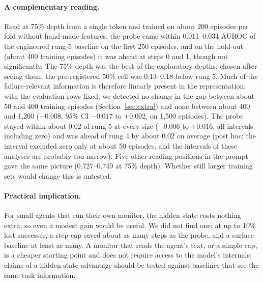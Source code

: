 \documentclass[11pt]{article}
\begin{document}
\paragraph{A complementary reading.} Read at 75\% depth from a single token and trained on about 200 episodes per fold without hand-made features, the probe came within 0.011--0.034 AUROC of the engineered rung-5 baseline on the first 250 episodes, and on the hold-out (about 400 training episodes) it was ahead at steps 0 and 1, though not significantly. The 75\% depth was the best of the exploratory depths, chosen after seeing them; the pre-registered 50\% cell was 0.13--0.18 below rung 5. Much of the failure-relevant information is therefore linearly present in the representation; with the evaluation rows fixed, we detected no change in the gap between about 50 and 400 training episodes (Section~\ref{sec:extra}) and none between about 400 and 1,200 ($-0.008$, 95\% CI $-0.017$ to $+0.002$, on 1,500 episodes). The probe stayed within about 0.02 of rung 5 at every size ($-0.006$ to $+0.016$, all intervals including zero) and was ahead of rung 4 by about 0.02 on average (post hoc; the interval excluded zero only at about 50 episodes, and the intervals of these analyses are probably too narrow). Five other reading positions in the prompt gave the same picture (0.727--0.749 at 75\% depth). Whether still larger training sets would change this is untested.

\paragraph{Practical implication.} For small agents that run their own monitor, the hidden state costs nothing extra, so even a modest gain would be useful. We did not find one: at up to 10\% lost successes, a step cap saved about as many steps as the probe, and a surface baseline at least as many.
A monitor that reads the agent's text, or a simple cap, is a cheaper starting point and does not require access to the model's internals; claims of a hidden-state advantage should be tested against baselines that see the same task information.
\end{document}

